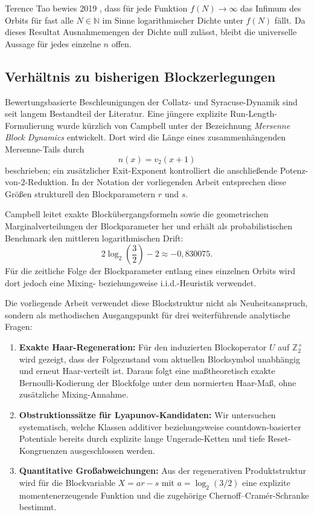 \documentclass[11pt,reqno]{amsart}
\theoremstyle{definition}
\theoremstyle{remark}
\numberwithin{equation}{section}
\begin{document}
Terence Tao bewies 2019 \cite{Tao2019}, dass f\"ur jede Funktion $f(N) \to \infty$ das Infimum des Orbits f\"ur fast alle $N \in \mathbb{N}$ im Sinne logarithmischer Dichte unter $f(N)$ f\"allt. Da dieses Resultat Ausnahmemengen der Dichte null zul\"asst, bleibt die universelle Aussage f\"ur jedes einzelne $n$ offen.

\subsection{Verh\"altnis zu bisherigen Blockzerlegungen}

Bewertungsbasierte Beschleunigungen der Collatz- und Syracuse-Dynamik sind seit langem Bestandteil der Literatur. Eine j\"ungere explizite Run-Length-Formulierung wurde k\"urzlich von Campbell \cite{Campbell2025} unter der Bezeichnung \emph{Mersenne Block Dynamics} entwickelt. Dort wird die L\"ange eines zusammenh\"angenden Mersenne-Tails durch
\begin{equation}
n(x) = v_2(x + 1)
\end{equation}
beschrieben; ein zus\"atzlicher Exit-Exponent kontrolliert die anschlie\ss{}ende Potenz-von-$2$-Reduktion. In der Notation der vorliegenden Arbeit entsprechen diese Gr\"o\ss{}en strukturell den Blockparametern $r$ und $s$.

Campbell leitet exakte Block\"ubergangsformeln sowie die geometrischen Marginalverteilungen der Blockparameter her und erh\"alt als probabilistischen Benchmark den mittleren logarithmischen Drift:
\begin{equation}
2\log_2\!\left(\frac{3}{2}\right) - 2 \approx -0{,}830075.
\end{equation}
F\"ur die zeitliche Folge der Blockparameter entlang eines einzelnen Orbits wird dort jedoch eine Mixing- beziehungsweise i.i.d.-Heuristik verwendet.

Die vorliegende Arbeit verwendet diese Blockstruktur nicht als Neuheitsanspruch, sondern als methodischen Ausgangspunkt f\"ur drei weiterf\"uhrende analytische Fragen:
\begin{enumerate}
\item \textbf{Exakte Haar-Regeneration:} F\"ur den induzierten Blockoperator $U$ auf $\mathbb{Z}_2^\times$ wird gezeigt, dass der Folgezustand vom aktuellen Blocksymbol unabh\"angig und erneut Haar-verteilt ist. Daraus folgt eine ma\ss{}theoretisch exakte Bernoulli-Kodierung der Blockfolge unter dem normierten Haar-Ma\ss{}, ohne zus\"atzliche Mixing-Annahme.
\item \textbf{Obstruktionss\"atze f\"ur Lyapunov-Kandidaten:} Wir untersuchen systematisch, welche Klassen additiver beziehungsweise countdown-basierter Potentiale bereits durch explizite lange Ungerade-Ketten und tiefe Reset-Kongruenzen ausgeschlossen werden.
\item \textbf{Quantitative Gro\ss{}abweichungen:} Aus der regenerativen Produktstruktur wird f\"ur die Blockvariable $X = a r - s$ mit $a = \log_2(3/2)$ eine explizite momentenerzeugende Funktion und die zugeh\"orige Chernoff--Cram\'er-Schranke bestimmt.
\end{enumerate}
\end{document}
